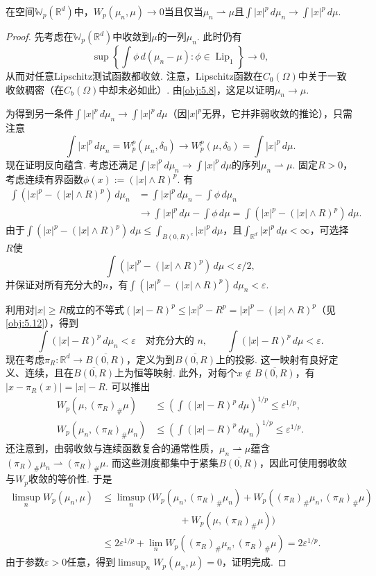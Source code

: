 \begin{theorem}\label{obj:5.11}
在空间$\mathbb W_p(\mathbb R^d)$中，$W_p(\mu_n,\mu)\to0$当且仅当$\mu_n\rightharpoonup\mu$且$\int|x|^p\,d\mu_n\to\int|x|^p\,d\mu$.
\end{theorem}
\begin{proof}
先考虑在$\mathbb W_p(\mathbb R^d)$中收敛到$\mu$的一列$\mu_n$. 此时仍有
\[
\sup\left\{\int\phi\,d(\mu_n-\mu):\phi\in\operatorname{Lip}_1\right\}\longrightarrow0,
\]
从而对任意Lipschitz测试函数都收敛. 注意，Lipschitz函数在$C_0(\Omega)$中关于一致收敛稠密（在$C_b(\Omega)$中却未必如此）. 由\autoref{obj:5.8}，这足以证明$\mu_n\to\mu$.

为得到另一条件$\int|x|^p\,d\mu_n\to\int|x|^p\,d\mu$（因$|x|^p$无界，它并非弱收敛的推论），只需注意
\[
\int|x|^p\,d\mu_n=W_p^p(\mu_n,\delta_0)
\longrightarrow W_p^p(\mu,\delta_0)=\int|x|^p\,d\mu.
\]
现在证明反向蕴含. 考虑还满足$\int|x|^p\,d\mu_n\to\int|x|^p\,d\mu$的序列$\mu_n\rightharpoonup\mu$. 固定$R>0$，考虑连续有界函数$\phi(x):=(|x|\wedge R)^p$. 有
\[
\begin{aligned}
\int(|x|^p-(|x|\wedge R)^p)\,d\mu_n
&=\int|x|^p\,d\mu_n-\int\phi\,d\mu_n\\
&\longrightarrow\int|x|^p\,d\mu-\int\phi\,d\mu
=\int(|x|^p-(|x|\wedge R)^p)\,d\mu.
\end{aligned}
\]
由于$\int(|x|^p-(|x|\wedge R)^p)\,d\mu\le\int_{B(0,R)^c}|x|^p\,d\mu$，且$\int_{\mathbb R^d}|x|^p\,d\mu<\infty$，可选择$R$使
\[
\int(|x|^p-(|x|\wedge R)^p)\,d\mu<\varepsilon/2,
\]
并保证对所有充分大的$n$，有$\int(|x|^p-(|x|\wedge R)^p)\,d\mu_n<\varepsilon$.

利用对$|x|\ge R$成立的不等式$(|x|-R)^p\le|x|^p-R^p=|x|^p-(|x|\wedge R)^p$（见\autoref{obj:5.12}），得到
\[
\int(|x|-R)^p\,d\mu_n<\varepsilon\quad\text{对充分大的 }n,
\qquad\int(|x|-R)^p\,d\mu<\varepsilon.
\]
现在考虑$\pi_R:\mathbb R^d\to\overline{B(0,R)}$，定义为到$\overline{B(0,R)}$上的投影. 这一映射有良好定义、连续，且在$\overline{B(0,R)}$上为恒等映射. 此外，对每个$x\notin\overline{B(0,R)}$，有$|x-\pi_R(x)|=|x|-R$. 可以推出
\[
\begin{aligned}
W_p(\mu,(\pi_R)_\#\mu)&\le\left(\int(|x|-R)^p\,d\mu\right)^{1/p}\le\varepsilon^{1/p},\\
W_p(\mu_n,(\pi_R)_\#\mu_n)&\le\left(\int(|x|-R)^p\,d\mu_n\right)^{1/p}\le\varepsilon^{1/p}.
\end{aligned}
\]
还注意到，由弱收敛与连续函数复合的通常性质，$\mu_n\rightharpoonup\mu$蕴含$(\pi_R)_\#\mu_n\rightharpoonup(\pi_R)_\#\mu$. 而这些测度都集中于紧集$\overline{B(0,R)}$，因此可使用弱收敛与$W_p$收敛的等价性. 于是
\[
\begin{aligned}
\limsup_nW_p(\mu_n,\mu)
&\le\limsup_n\bigl(W_p(\mu_n,(\pi_R)_\#\mu_n)
+W_p((\pi_R)_\#\mu_n,(\pi_R)_\#\mu)\\
&\hspace{8em}+W_p(\mu,(\pi_R)_\#\mu)\bigr)\\
&\le2\varepsilon^{1/p}+\lim_nW_p((\pi_R)_\#\mu_n,(\pi_R)_\#\mu)=2\varepsilon^{1/p}.
\end{aligned}
\]
由于参数$\varepsilon>0$任意，得到$\limsup_nW_p(\mu_n,\mu)=0$，证明完成.
\end{proof}

